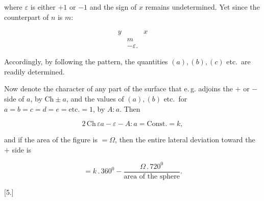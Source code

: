 %
\noindent where $\varepsilon$ is either $+1$ or $-1$ and the sign of $x$
remains undetermined. Yet since the counterpart of $n$ is $m$:

\[
\begin{array}{ccc}
y&&x \\
&m& \\
&-\varepsilon.&
\end{array}
\]

\noindent Accordingly, by following the pattern, the quantities $(a), (b),
(c)$ etc.\ are readily determined.

Now denote the character of any part of the surface that
e.\,g. adjoins the $+$ or $-$ side of $a$, by $\mathrm{Ch}\pm a$,
and the values of $(a), (b)$ etc.\ for $a=b=c=d=e=\text{etc.}=1$, by
$A:a$. Then

\[
2\,\mathrm{Ch}\,\varepsilon a - \varepsilon - A:a = \text{Const.} = k,
\]

\noindent and if the area of the figure is $= \Omega$, then the entire lateral deviation
toward the $+$ side is

\[
= k\,.\,360^0 - \frac{\Omega\,.\,720^0}{\text{area of the sphere}}.
\]

\begin{center}[5.]\end{center}

\begin{center}\end{center}
